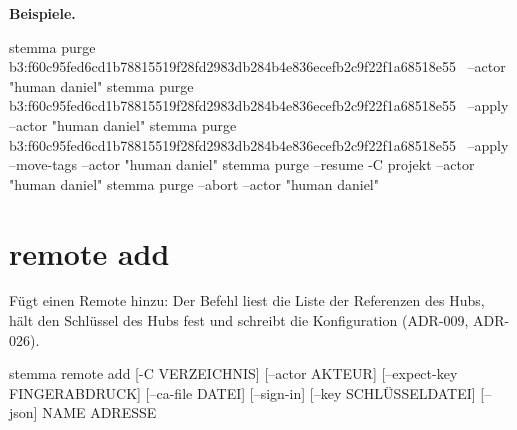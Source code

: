 {\bf Beispiele.}

\starttyping
stemma purge b3:f60c95fed6cd1b78815519f28fd2983db284b4e836ecefb2c9f22f1a68518e55 \
    --actor "human daniel"
stemma purge b3:f60c95fed6cd1b78815519f28fd2983db284b4e836ecefb2c9f22f1a68518e55 \
    --apply --actor "human daniel"
stemma purge b3:f60c95fed6cd1b78815519f28fd2983db284b4e836ecefb2c9f22f1a68518e55 \
    --apply --move-tags --actor "human daniel"
stemma purge --resume -C projekt --actor "human daniel"
stemma purge --abort --actor "human daniel"
\stoptyping

\section{remote add}

Fügt einen Remote hinzu: Der Befehl liest die Liste der Referenzen des Hubs, hält den Schlüssel
des Hubs fest und schreibt die Konfiguration (ADR-009, ADR-026).

\starttyping
stemma remote add [-C VERZEICHNIS] [--actor AKTEUR] [--expect-key FINGERABDRUCK]
                  [--ca-file DATEI] [--sign-in] [--key SCHLÜSSELDATEI] [--json]
                  NAME ADRESSE
\stoptyping


